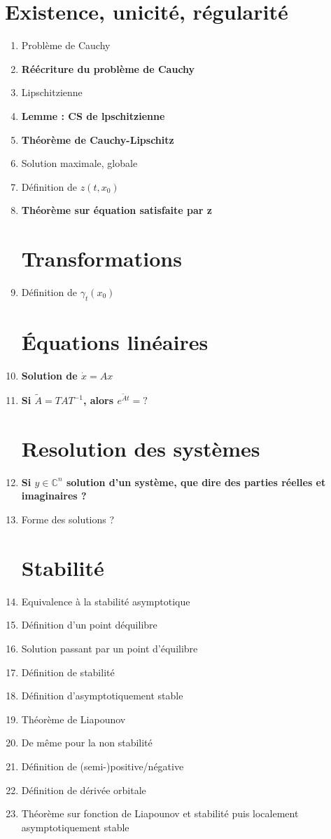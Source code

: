 \documentclass{article}
\begin{document}
\section{Existence, unicité, régularité}
\begin{enumerate}
\item Problème de Cauchy
\item \textbf{Réécriture du problème de Cauchy}
\item Lipschitzienne
\item \textbf{Lemme : CS de lpschitzienne}
\item \textbf{Théorème de Cauchy-Lipschitz}
\item Solution maximale, globale
\item Définition de $z(t,x_0)$
\item \textbf{Théorème sur équation satisfaite par z}
\section{Transformations}
\item Définition de $\gamma_t(x_0)$
\section{Équations linéaires}
\item \textbf{Solution de $\dot{x}=Ax$}
\item \textbf{Si $\tilde{A}=TAT^{-1}$, alors $e^{\tilde{A}t}=?$}
\section{Resolution des systèmes}
\item \textbf{Si $y\in\mathbb{C}^n$ solution d'un système, que dire des parties réelles et imaginaires ?}
\item Forme des solutions ?
\section{Stabilité}
\item Equivalence à la stabilité asymptotique
\item Définition d'un point déquilibre
\item Solution passant par un point d'équilibre
\item Définition de stabilité
\item Définition d'asymptotiquement stable
\item Théorème de Liapounov
\item De même pour la non stabilité
\item Définition de (semi-)positive/négative
\item Définition de dérivée orbitale
\item Théorème sur fonction de Liapounov et stabilité puis localement asymptotiquement stable

\end{enumerate}
\end{document}
